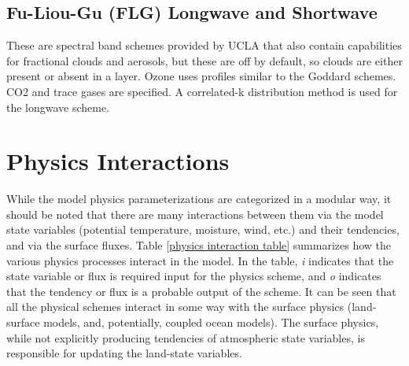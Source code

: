 \subsection {Fu-Liou-Gu (FLG) Longwave and Shortwave}

These are spectral band schemes provided by UCLA  \citep{gu11,fu92}
that also contain capabilities for fractional clouds and aerosols, but these are off by default,
so clouds are either present or absent in a layer. Ozone uses profiles similar to the
Goddard schemes. CO2 and trace gases are specified.
A correlated-k distribution method is used for the longwave scheme.

\section {Physics Interactions}

While the model physics parameterizations are categorized in a modular way,
it should be noted that there are many interactions between them via the
model state variables (potential temperature, moisture, wind, etc.)
and their tendencies, and via the surface fluxes.
Table \ref {physics interaction table} summarizes how the various physics
processes interact in the model. In the table, {\em i} indicates that the 
state variable or flux is required input for the physics scheme, and {\em o}
indicates that the tendency or flux is a probable output of the scheme.
It can be seen that all the physical schemes interact in some way with the surface
physics (land-surface models, and, potentially, coupled ocean models).
The surface physics, while not explicitly producing tendencies of atmospheric
state variables, is responsible for updating the land-state variables.


